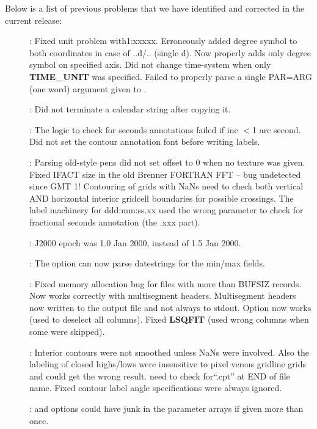 Below is a list of previous problems that we have identified and corrected in the current release:

\begin{description}
\item []: Fixed unit problem with1:xxxxx.  Erroneously added degree symbol
to both coordinates in case of ..d/.. (single d). Now properly adds only degree symbol on specified axis.
Did not change time-system when only \textbf{TIME\_UNIT} was specified.  Failed to properly parse a single PAR=ARG
(one word) argument given  to .
\item []: Did not terminate a calendar string after copying it.
\item []: The logic to check for seconds annotations failed if inc $<$1 arc second.
Did not set the contour annotation font before writing labels.
\item []: Parsing old-style pens did not set offset to 0 when no texture was given.
Fixed IFACT size in the old Brenner FORTRAN FFT -- bug undetected since GMT 1!
Contouring of grids with NaNs need to check both vertical AND horizontal interior gridcell boundaries
for possible crossings.  The label machinery for ddd:mm:ss.xx used the wrong parameter to check
for fractional seconds annotation (the .xxx part).
\item []: J2000 epoch was 1.0 Jan 2000, instead of 1.5 Jan 2000.
\item []: The  option can now parse datestrings for the min/max fields.
\item []: Fixed memory allocation bug for files with more than BUFSIZ records.
Now works correctly with multisegment headers.  Multisegment headers now written to the output file
and not always to stdout. Option  now works (used to deselect all columns).
Fixed \textbf{LSQFIT} (used wrong columns when some were skipped).
\item []: Interior contours were not smoothed unless NaNs were involved.  Also the
labeling of closed highs/lows were insensitive to pixel versus gridline grids and could get the wrong result.
 need to check for``.cpt'' at END of file name.  Fixed contour label angle specifications were always ignored.
\item []:  and  options could have junk in the parameter arrays if given more than once.

\end{description}
